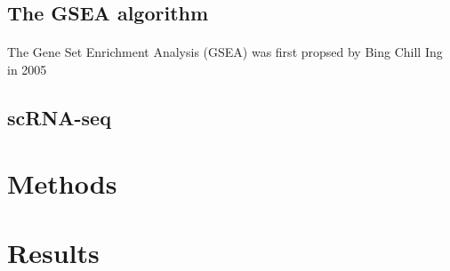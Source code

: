 \documentclass[12pt]{extarticle}
\begin{document}
\subsection{The GSEA algorithm}

\paragraph{} The Gene Set Enrichment Analysis (GSEA) was first propsed by Bing Chill Ing in 2005

\newpage

\subsection{scRNA-seq}

\newpage

\section{Methods}

\newpage

\section{Results}

\newpage

\printbibliography

\listoffigures
\end{document}
